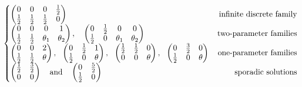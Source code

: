 \documentclass[12]{amsart}
\begin{document}
\begin{equation}
\left\{\begin{matrix}
\begin{pmatrix}0&0&0&\frac{1}{2}\\ \frac{1}{2}&\frac{1}{2}&\frac{1}{2}&0\end{pmatrix}\hfill\hfill
\text{infinite discrete family}\\
\begin{pmatrix}0&0&0&1\\ \frac{1}{2}&\frac{1}{2}&\theta_1&\theta_2\end{pmatrix},\ \ \ 
\begin{pmatrix}0&\frac{1}{2}&0&0\\ \frac{1}{2}&0&\theta_1&\theta_2\end{pmatrix}\hfill\hfill
\text{two-parameter families}\\
\begin{pmatrix}0&0&2\\ \frac{1}{2}&\frac{1}{2}&\theta\end{pmatrix},\ \ 
\begin{pmatrix}0&\frac{1}{2}&1\\ \frac{1}{2}&0&\theta\end{pmatrix},\ \ 
\begin{pmatrix}\frac{1}{2}&\frac{1}{2}&0\\ 0&0&\theta\end{pmatrix},\ \ 
\begin{pmatrix}0&\frac{3}{2}&0\\ \frac{1}{2}&0&\theta\end{pmatrix}\ \ \
\text{one-parameter families}\\
\begin{pmatrix}\frac{1}{2}&\frac{3}{2}\\ 0&0\end{pmatrix}\ \ \ \text{and}\ \ \ 
\begin{pmatrix}0&\frac{5}{2}\\ \frac{1}{2}&0\end{pmatrix}\hfill\hfill
\text{sporadic solutions}
\end{matrix}\right.
\end{equation}
\end{document}
